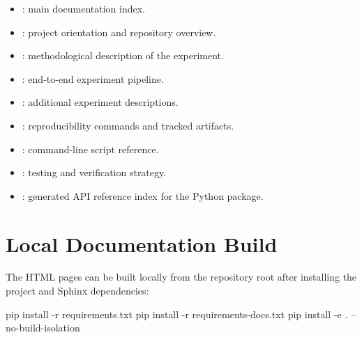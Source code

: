 \begin{itemize}
    \item \href{https://github.com/matteogiorgi/nn-option-pricing/blob/main/docs/source/index.rst}{}: main documentation index.
    \item \href{https://github.com/matteogiorgi/nn-option-pricing/blob/main/docs/source/overview.rst}{}: project orientation and repository overview.
    \item \href{https://github.com/matteogiorgi/nn-option-pricing/blob/main/docs/source/methodology.rst}{}: methodological description of the experiment.
    \item \href{https://github.com/matteogiorgi/nn-option-pricing/blob/main/docs/source/experiment_pipeline.rst}{}: end-to-end experiment pipeline.
    \item \href{https://github.com/matteogiorgi/nn-option-pricing/blob/main/docs/source/experiments.rst}{}: additional experiment descriptions.
    \item \href{https://github.com/matteogiorgi/nn-option-pricing/blob/main/docs/source/reproducibility.rst}{}: reproducibility commands and tracked artifacts.
    \item \href{https://github.com/matteogiorgi/nn-option-pricing/blob/main/docs/source/command_reference.rst}{}: command-line script reference.
    \item \href{https://github.com/matteogiorgi/nn-option-pricing/blob/main/docs/source/testing.rst}{}: testing and verification strategy.
    \item \href{https://github.com/matteogiorgi/nn-option-pricing/blob/main/docs/source/api/index.rst}{}: generated API reference index for the Python package.
\end{itemize}

\section{Local Documentation Build}

The HTML pages can be built locally from the repository root after installing the project and Sphinx dependencies:

\begin{projectlistingbox}[shellstyle]
pip install -r requirements.txt
pip install -r requirements-docs.txt
pip install -e . --no-build-isolation
\end{projectlistingbox}

